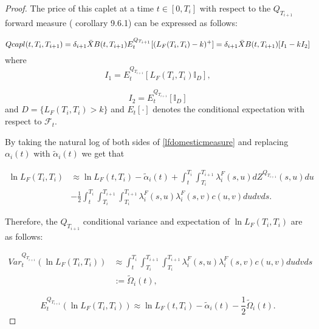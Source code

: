 \documentclass[11pt]{article}
\newcommand{\filt}{\ensuremath{\mathcal{F}}}
\begin{document}
\begin{proof}
The price of this caplet at a time $t\in [0,T_i]$ with respect to the $Q_{T_{i+1}}$ forward measure (\cite{musiela} corollary 9.6.1) can be expressed as follows:

\begin{equation*}
    Qcapl(t,T_i,T_{i+1})=\delta_{i+1}\Bar{X}B(t,T_{i+1})E_t^{Q_{T_{i+1}}}[(L_F(T_i,T_i)-k)^+]=\delta_{i+1}\Bar{X}B(t,T_{i+1})[I_1-kI_2]
\end{equation*}
where 
\begin{equation*}
    I_1=E_t^{Q_{T_{i+1}}}[L_F(T_i,T_i)\mathbb{I}_D],
\end{equation*}



\begin{equation*}
    I_2=E_t^{Q_{T_{i+1}}}[\mathbb{I}_D]
\end{equation*}
and $D=\{L_F(T_i,T_i)>k\}$ and $E_t[\cdot]$ denotes the conditional expectation with respect to $\filt_t.$

By taking the natural log of both sides of \eqref{lfdomesticmeasure} and replacing $\alpha_i(t)$ with $\tilde{\alpha}_i(t)$ we get that 

\begin{equation}\label{logfl2}
\begin{split}
    \ln L_F(T_i,T_i)&\approx\ln L_F(t,T_i)-\tilde{\alpha}_i(t)+\int_t^{T_i}\int_{T_i}^{T_{i+1}}\lambda^F_i(s,u)dZ^{Q_{T_{i+1}}}(s,u)du\\
        &-\frac{1}{2}\int_t^{T_i}\int_{T_i}^{T_{i+1}}\int_{T_i}^{T_{i+1}}\lambda^F_i(s,u)\lambda^F_i(s,v)c(u,v)dudvds.
\end{split}
\end{equation}

Therefore, the $Q_{T_{i+1}}$ conditional variance and expectation of $\ln L_F(T_i,T_i)$ are as follows:

\begin{equation}\label{logv}
\begin{split}
    Var_t^{Q_{T_{i+1}}}(\ln L_F(T_i,T_i))&\approx\int_t^{T_i}\int_{T_i}^{T_{i+1}}\int_{T_i}^{T_{i+1}}\lambda^F_i(s,u)\lambda^F_i(s,v)c(u,v)dudvds\\
    &:=\tilde{\Omega}_i(t),
\end{split}    
\end{equation}

\begin{equation}\label{loge}
    E_t^{Q_{T_{i+1}}}(\ln L_F(T_i,T_i))\approx\ln L_F(t,T_i)-\tilde{\alpha}_i(t)-\frac{1}{2}\tilde{\Omega}_i(t).
\end{equation}


\end{proof}
\end{document}
